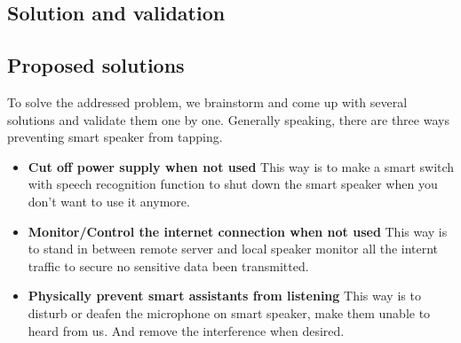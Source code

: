 \documentclass[12pt,twoside]{article}
\begin{document}
\subsection{Solution and validation}
\subsection{Proposed solutions}
To solve the addressed problem, we brainstorm and come up with several solutions and validate them one by one.
Generally speaking, there are three ways preventing smart speaker from tapping.
\begin{itemize}
\item \textbf{Cut off power supply when not used } This way is to make a smart switch with speech recognition function to shut down the 
smart speaker when you don't want to use it anymore.
\item \textbf{Monitor/Control the internet connection when not used} This way is to stand in between remote server and local speaker 
monitor all the internt traffic to secure no sensitive data been transmitted.
\item \textbf{Physically prevent smart assistants from listening} This way is to disturb or deafen the microphone on smart speaker, 
make them unable to heard from us. And remove the interference when desired.
\end{itemize}
\end{document}
